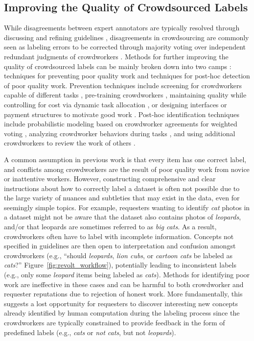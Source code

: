 \subsection{Improving the Quality of Crowdsourced Labels}
While disagreements between expert annotators are typically resolved through discussing and refining guidelines \cite{marcus1993building}, disagreements in crowdsourcing are commonly seen as labeling errors to be corrected through majority voting over independent redundant judgments of crowdworkers \cite{kairam2016parting}. 
Methods for further improving the quality of crowdsourced labels can be mainly broken down into two camps \cite{kittur2013future}: techniques for preventing poor quality work and techniques for post-hoc detection of poor quality work. Prevention techniques include screening for crowdworkers capable of different tasks \cite{Difallah:2013:PTM:2488388.2488421,kamar2012combining}, pre-training crowdworkers \cite{doroudi2016toward}, maintaining quality while controlling for cost via dynamic task allocation \cite{Tran-Thanh:2014:BBL:2615731.2615809,bragg2013crowdsourcing}, or designing interfaces or payment structures to motivate good work \cite{mitra2015comparing,rogstadius2011assessment,hansen2013quality}. Post-hoc identification techniques include probabilistic modeling based on crowdworker agreements for weighted voting \cite{ipeirotis2010quality}, analyzing crowdworker behaviors during tasks \cite{rzeszotarski2012crowdscape}, and using additional crowdworkers to review the work of others \cite{callison2010creating,hansen2013quality}.

A common assumption in previous work is that every item has one correct label, and conflicts among crowdworkers are the result of poor quality work from novice or inattentive workers. However, constructing comprehensive and clear instructions about how to correctly label a dataset is often not possible due to the large variety of nuances and subtleties that may exist in the data, even for seemingly simple topics. For example, requesters wanting to identify \emph{cat} photos in a dataset might not be aware that the dataset also contains photos of \emph{leopards}, and/or that leopards are sometimes referred to as \emph{big cats}. As a result, crowdworkers often have to label with incomplete information. Concepts not specified in guidelines are then open to interpretation and confusion amongst crowdworkers (e.g., ``should \emph{leopards}, \emph{lion cubs}, or \emph{cartoon cats} be labeled as \emph{cats}?'' Figure~\ref{fig:revolt_workflow}), potentially leading to inconsistent labels (e.g., only some \emph{leopard} items being labeled as \emph{cats}). Methods for identifying poor work are ineffective in these cases and can be harmful to both crowdworker and requester reputations due to rejection of honest work. More fundamentally, this suggests a lost opportunity for requesters to discover interesting new concepts already identified by human computation during the labeling process since the crowdworkers are typically constrained to provide feedback in the form of predefined labels (e.g., \emph{cats} or \emph{not cats}, but not \emph{leopards}).

